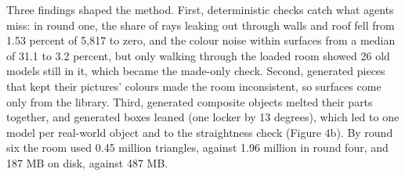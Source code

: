 Three findings shaped the method. First, deterministic checks catch what agents miss: in round one, the share of rays leaking out through walls and roof fell from 1.53 percent of 5,817 to zero, and the colour noise within surfaces from a median of 31.1 to 3.2 percent, but only walking through the loaded room showed 26 old models still in it, which became the made-only check. Second, generated pieces that kept their pictures' colours made the room inconsistent, so surfaces come only from the library. Third, generated composite objects melted their parts together, and generated boxes leaned (one locker by 13 degrees), which led to one model per real-world object and to the straightness check (Figure 4b). By round six the room used 0.45 million triangles, against 1.96 million in round four, and 187 MB on disk, against 487 MB.
